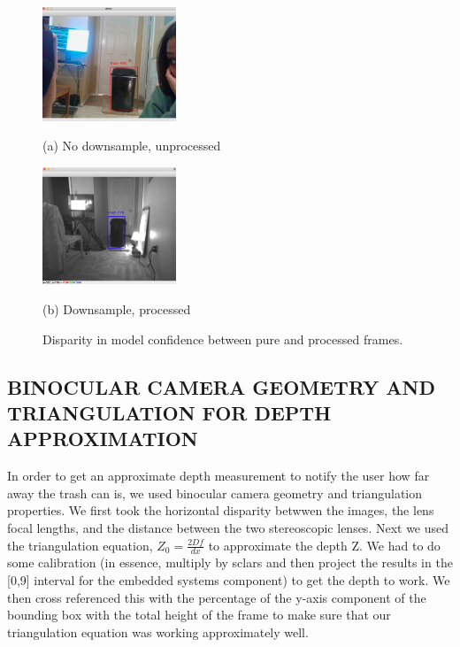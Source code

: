 \documentclass{article}
\begin{document}
\begin{center}
\begin{figure}
%
\begin{minipage}[b]{.48\linewidth}
  \centering
  \centerline{\includegraphics[width=4.0cm]{fullres.jpg}}
  \centerline{(a) No downsample, unprocessed}\medskip
\end{minipage}
\hfill
\begin{minipage}[b]{0.48\linewidth}
  \centering
  \centerline{\includegraphics[width=4.0cm]{processed.jpg}}
  \centerline{(b) Downsample, processed}\medskip
\end{minipage}
%
\caption{Disparity in model confidence between pure and processed frames.}
\label{figures2}
%
\end{figure}
\end{center}




\subsection{BINOCULAR CAMERA GEOMETRY AND TRIANGULATION FOR DEPTH APPROXIMATION}
\label{ssec:triangulation}

In order to get an approximate depth measurement to notify the user how far away the trash can is, we used binocular camera geometry and triangulation properties. We first took the horizontal disparity betwwen the images, the lens focal lengths, and the distance between the two stereoscopic lenses. Next we used the triangulation equation, $Z_0 = \frac{2Df}{dx}$ \cite{Bovik19} to approximate the depth Z. We had to do some calibration (in essence, multiply by sclars and then project the results in the [0,9] interval for the embedded systems component) to get the depth to work. We then cross referenced this with the percentage of the y-axis component of the bounding box with the total height of the frame to make sure that our triangulation equation was working approximately well. 
\end{document}
